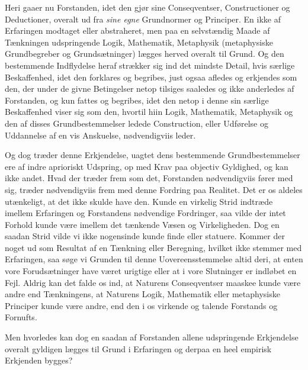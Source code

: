 \documentclass[12pt,a4paper]{book}
\newcommand{\apage}[1]{\marginnote{\footnotesize\textit{[#1]}}}
\begin{document}
Heri gaaer nu Forstanden, idet den gjør sine Conseqventser, Constructioner og
Deductioner, overalt ud fra \emph{sine egne} Grundnormer og Principer. En ikke
af Erfaringen modtaget eller abstraheret, men paa en selvstændig Maade af  \apage{64}
Tænkningen udspringende Logik, Mathematik, Metaphysik (metaphysiske
Grundbegreber og Grundsætninger) lægges herved overalt til Grund. Og den
bestemmende Indflydelse heraf strækker sig ind det mindste Detail, hvis særlige
Beskaffenhed, idet den forklares og begribes, just ogsaa afledes og erkjendes
som den, der under de givne Betingelser netop tilsiges saaledes og ikke
anderledes af Forstanden, og kun fattes og begribes, idet den netop i denne sin
særlige Beskaffenhed viser sig som den, hvortil hiin Logik, Mathematik,
Metaphysik og den af disses Grundbestemmelser ledede Construction, eller
Udførelse og Uddannelse af en vis Anskuelse, nødvendigviis leder.

Og dog træder denne Erkjendelse, uagtet dens bestemmende Grundbestemmelser ere af
indre aprioriskt Udspring, op med Krav paa objectiv Gyldighed, og kan ikke andet.
Hvad der træder frem som det, Forstanden nødvendigviis fører med sig, træder
nødvendigviis frem med denne Fordring paa Realitet. Det er os aldeles utænkeligt,
at det ikke skulde have den. Kunde en virkelig Strid indtræde imellem Erfaringen
og Forstandens nødvendige Fordringer, saa vilde der intet Forhold kunde være
imellem det tænkende Væsen og Virkeligheden. Dog en saadan Strid vilde vi ikke
nogensinde kunde finde eller statuere. Kommer der noget ud som Resultat af en
Tænkning eller Beregning, hvilket ikke stemmer med  \apage{65} Erfaringen, saa søge vi
Grunden til denne Uovereensstemmelse altid deri, at enten vore Forudsætninger
have været urigtige eller at i vore Slutninger er indløbet en Fejl. Aldrig kan
det falde os ind, at Naturens Conseqventser maaskee kunde være andre end
Tænkningens, at Naturens Logik, Mathematik eller metaphysiske Principer kunde
være andre, end den i os virkende og talende Forstands og Fornufts.

Men hvorledes kan dog en saadan af Forstanden allene udspringende Erkjendelse
overalt gyldigen lægges til Grund i Erfaringen og derpaa en heel empirisk
Erkjenden bygges?
\end{document}
